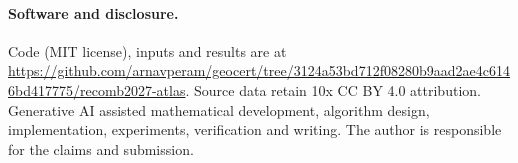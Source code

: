 \documentclass[10pt,letterpaper]{article}
\begin{document}
\paragraph{Software and disclosure.}
Code (MIT license), inputs and results are at \url{https://github.com/arnavperam/geocert/tree/3124a53bd712f08280b9aad2ae4c6146bd417775/recomb2027-atlas}. Source data retain 10x CC BY 4.0 attribution. Generative AI assisted mathematical development, algorithm design, implementation, experiments, verification and writing. The author is responsible for the claims and submission.

\clearpage

\end{document}
